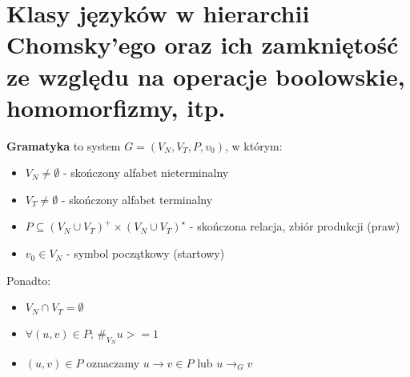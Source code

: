 \documentclass[main.tex]{subfiles}
\begin{document}
    \section{Klasy języków w hierarchii Chomsky’ego oraz ich zamkniętość ze względu na operacje boolowskie, homomorfizmy, itp.}

    \begin{definition}
        \textbf{Gramatyka} to system $G=(V_N,V_T,P,v_0)$, w którym:
        \begin{itemize}[noitemsep]
            \item $V_N \ne \emptyset$ - skończony alfabet nieterminalny
            \item $V_T \ne \emptyset$ - skończony alfabet terminalny
            \item $P \subseteq (V_N \cup V_T)^+ \times (V_N \cup V_T)^\star$ - skończona relacja, zbiór produkcji (praw)
            \item $v_0 \in V_N$ - symbol początkowy (startowy)
        \end{itemize}

        Ponadto:
        \begin{itemize}[noitemsep]
            \item $V_N \cap V_T = \emptyset$
            \item $\forall (u,v)\in P$; $\#_{V_N} u >= 1$
            \item $(u,v) \in P$ oznaczamy $u \rightarrow v \in P$ lub $u \rightarrow_G v$
        \end{itemize}
        \label{def:gram}
    \end{definition}
\end{document}
